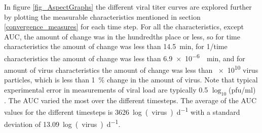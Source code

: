 In figure \ref{fig_AspectGraphs} the different viral titer curves are explored further by plotting the measurable characteristics mentioned in section \ref{convergence_measures} for each time step. For all the characteristics, except AUC, the amount of change was in the hundredths place or less, so for time characteristics the amount of change was less than \SI{14.5}{\minute}, for 1/time characteristics the amount of change was less than \SI{6.9e-6}{\per\minute}, and for amount of virus characteristics the amount of change was less than \num{e10} virus particles, which is less than \SI{1}{\percent} change in the amount of virus. Note that typical experimental error in measurements of viral load are typically 0.5 $\log_{10}$(pfu/ml) \cite{labarre01}. The AUC varied the most over the different timesteps. The average of the AUC values for the different timesteps is \SI{3626}{log(virus)\per\day} with a standard deviation of \SI{13.09}{log(virus)\per\day}. 

